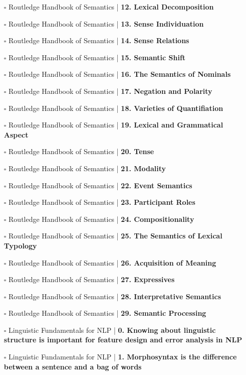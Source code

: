 \documentclass[a4, landscape, 12pt]{article}
\newcommand{\checkbox}{$\square$}%
\begin{document}
\begin{itemize}
{}
\item [\checkbox]  Routledge Handbook of Semantics | \textbf{ 12. Lexical Decomposition
}
\item [\checkbox]  Routledge Handbook of Semantics | \textbf{ 13. Sense Individuation
}
\item [\checkbox]  Routledge Handbook of Semantics | \textbf{ 14. Sense Relations
}
\item [\checkbox]  Routledge Handbook of Semantics | \textbf{ 15. Semantic Shift
}
\item [\checkbox]  Routledge Handbook of Semantics | \textbf{ 16. The Semantics of Nominals
}
\item [\checkbox]  Routledge Handbook of Semantics | \textbf{ 17. Negation and Polarity
}
\item [\checkbox]  Routledge Handbook of Semantics | \textbf{ 18. Varieties of Quantifiation
}
\item [\checkbox]  Routledge Handbook of Semantics | \textbf{ 19. Lexical and Grammatical Aspect
}
\item [\checkbox]  Routledge Handbook of Semantics | \textbf{ 20. Tense
}
\item [\checkbox]  Routledge Handbook of Semantics | \textbf{ 21. Modality
}
\item [\checkbox]  Routledge Handbook of Semantics | \textbf{ 22. Event Semantics
}
\item [\checkbox]  Routledge Handbook of Semantics | \textbf{ 23. Participant Roles
}
\item [\checkbox]  Routledge Handbook of Semantics | \textbf{ 24. Compositionality
}
\item [\checkbox]  Routledge Handbook of Semantics | \textbf{ 25. The Semantics of Lexical Typology
}
\item [\checkbox]  Routledge Handbook of Semantics | \textbf{ 26. Acquisition of Meaning
}
\item [\checkbox]  Routledge Handbook of Semantics | \textbf{ 27. Expressives
}
\item [\checkbox]  Routledge Handbook of Semantics | \textbf{ 28. Interpretative Semantics
}
\item [\checkbox]  Routledge Handbook of Semantics | \textbf{ 29. Semantic Processing
}
\item [\checkbox]  Linguistic Fundamentals for NLP | \textbf{ 0. Knowing about linguistic structure is important for feature design and error analysis in NLP
}
\item [\checkbox]  Linguistic Fundamentals for NLP | \textbf{ 1. Morphosyntax is the difference between a sentence and a bag of words
}
\end{itemize}
\end{document}
